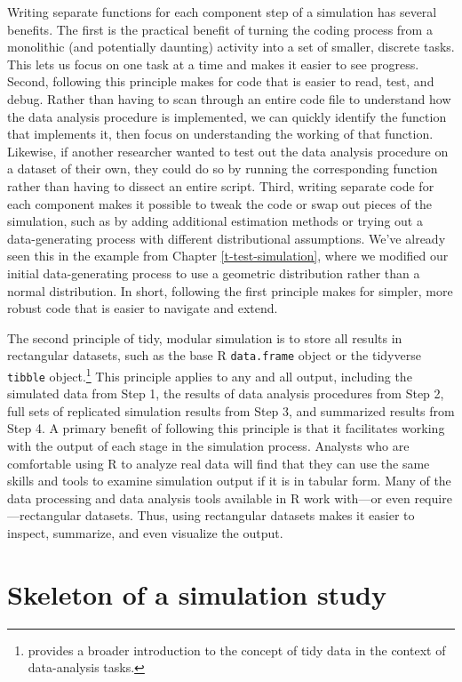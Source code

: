 \documentclass[
]{book}
\begin{document}
Writing separate functions for each component step of a simulation has several benefits.
The first is the practical benefit of turning the coding process from a monolithic (and potentially daunting) activity into a set of smaller, discrete tasks.
This lets us focus on one task at a time and makes it easier to see progress.
Second, following this principle makes for code that is easier to read, test, and debug.
Rather than having to scan through an entire code file to understand how the data analysis procedure is implemented, we can quickly identify the function that implements it, then focus on understanding the working of that function.
Likewise, if another researcher wanted to test out the data analysis procedure on a dataset of their own, they could do so by running the corresponding function rather than having to dissect an entire script.
Third, writing separate code for each component makes it possible to tweak the code or swap out pieces of the simulation, such as by adding additional estimation methods or trying out a data-generating process with different distributional assumptions.
We've already seen this in the example from Chapter \ref{t-test-simulation}, where we modified our initial data-generating process to use a geometric distribution rather than a normal distribution.
In short, following the first principle makes for simpler, more robust code that is easier to navigate and extend.

The second principle of tidy, modular simulation is to store all results in rectangular datasets, such as the base R \texttt{data.frame} object or the tidyverse \texttt{tibble} object.\footnote{\citet{Wickham2014tidydata} provides a broader introduction to the concept of tidy data in the context of data-analysis tasks.}
This principle applies to any and all output, including the simulated data from Step 1, the results of data analysis procedures from Step 2, full sets of replicated simulation results from Step 3, and summarized results from Step 4.
A primary benefit of following this principle is that it facilitates working with the output of each stage in the simulation process.
Analysts who are comfortable using R to analyze real data will find that they can use the same skills and tools to examine simulation output if it is in tabular form.
Many of the data processing and data analysis tools available in R work with---or even require---rectangular datasets.
Thus, using rectangular datasets makes it easier to inspect, summarize, and even visualize the output.

\section{Skeleton of a simulation study}\label{skeleton-of-a-simulation-study}
\end{document}
